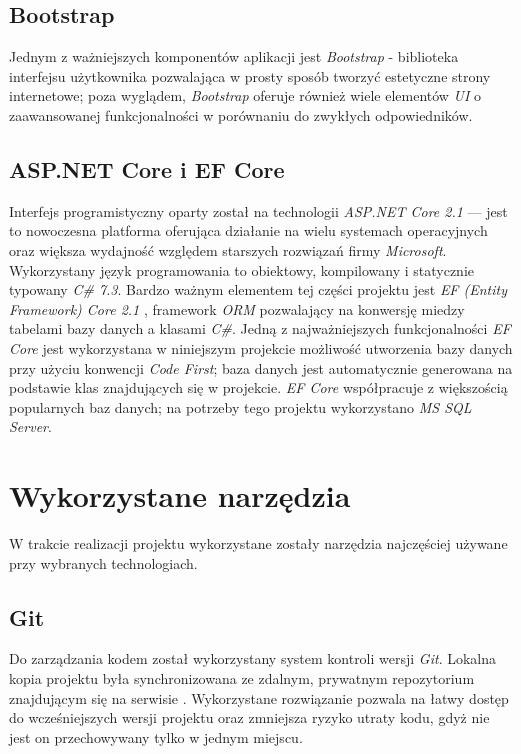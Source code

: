 \documentclass[eng,printmode,openany]{mgr}
\begin{document}
	\subsection{Bootstrap}
	Jednym z ważniejszych komponentów aplikacji jest \textit{Bootstrap} - biblioteka interfejsu użytkownika pozwalająca w prosty sposób tworzyć estetyczne strony internetowe; poza wyglądem, \textit{Bootstrap} oferuje również wiele elementów \textit{UI} o zaawansowanej funkcjonalności w porównaniu do zwykłych odpowiedników.
	
	\subsection{ASP.NET Core i EF Core}
	Interfejs programistyczny oparty został na technologii \textit{ASP.NET Core 2.1} — jest to nowoczesna platforma oferująca działanie na wielu systemach operacyjnych oraz większa wydajność względem starszych rozwiązań firmy \textit{Microsoft}. Wykorzystany język programowania to obiektowy, kompilowany i statycznie typowany \textit{C\# 7.3}. Bardzo ważnym elementem tej części projektu jest \textit{EF (Entity Framework) Core 2.1} \cite{msdn-efcore}, framework \textit{ORM}  pozwalający na konwersję miedzy tabelami bazy danych a klasami \textit{C\#}. Jedną z najważniejszych funkcjonalności \textit{EF Core} jest wykorzystana w niniejszym projekcie możliwość utworzenia bazy danych przy użyciu konwencji \textit{Code First}; baza danych jest automatycznie generowana na podstawie klas  znajdujących się w projekcie. \textit{EF Core} współpracuje z większością popularnych baz danych; na potrzeby tego projektu wykorzystano \textit{MS SQL Server}.
	
	\section{Wykorzystane narzędzia}
	W trakcie realizacji projektu wykorzystane zostały narzędzia najczęściej używane przy wybranych technologiach.
	\subsection{Git}
	Do zarządzania kodem został wykorzystany system kontroli wersji \textit{Git}. Lokalna kopia projektu była synchronizowana ze zdalnym, prywatnym repozytorium znajdującym się na serwisie . Wykorzystane rozwiązanie pozwala na łatwy dostęp do wcześniejszych wersji projektu oraz zmniejsza ryzyko utraty kodu, gdyż nie jest on przechowywany tylko w jednym miejscu.
\end{document}
